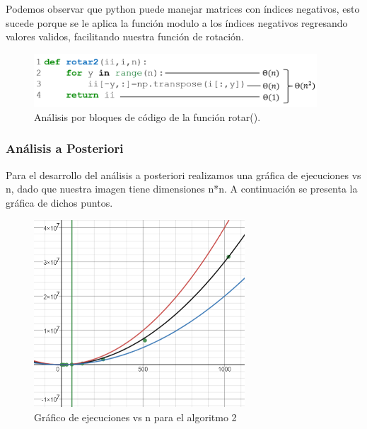 \documentclass[12pt,twoside]{article}
\begin{document}
        Podemos observar que python puede manejar matrices con índices negativos, esto sucede porque se le aplica la función modulo a los índices negativos regresando valores validos, facilitando nuestra función de rotación.
        \\
        \begin{figure}[H]
        \centering
        \includegraphics[height=2.0cm]{imagenes/c2.png}
        \caption{Análisis por bloques de código de la función rotar().}
        \end{figure}
        
        \subsubsection{An\'alisis a Posteriori}
        Para el desarrollo del análisis a posteriori realizamos una gráfica de ejecuciones vs n, dado que nuestra imagen tiene dimensiones n*n. A continuación se presenta la gráfica de dichos puntos.
        \\
        \begin{figure}[h]
        \centering
        \includegraphics[height=7cm]{imagenes/g1.png}
        \caption{Gráfico de ejecuciones vs n para el algoritmo 2}
        \end{figure}
        
\end{document}
